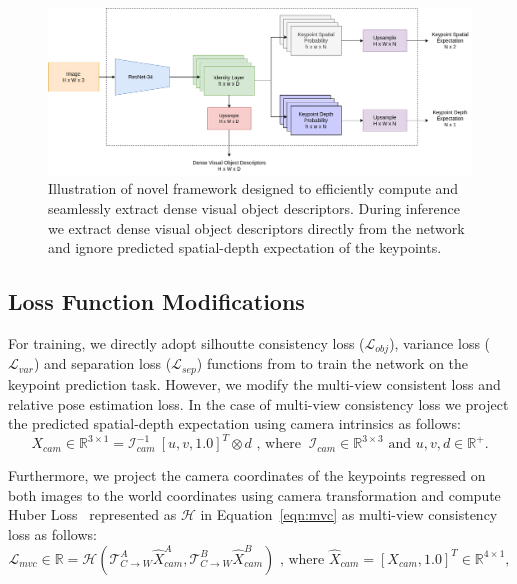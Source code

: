 \begin{figure}[htb]
    \centering
    \includegraphics[scale=0.35]{images/arch.png}
    \caption{Illustration of novel framework designed to efficiently compute and seamlessly extract dense visual object descriptors.
        During inference we extract dense visual object descriptors directly from the network and ignore predicted spatial-depth expectation of the keypoints.}
    \label{fig:modified_dnn}
\end{figure}


\subsection{Loss Function Modifications}

For training, we directly adopt silhoutte consistency loss ($\mathcal{L}_{obj}$), variance loss ($\mathcal{L}_{var}$) and separation loss ($\mathcal{L}_{sep}$) functions from \cite{suwajanakorn2018discovery} to train the network on the keypoint prediction task.
However, we modify the multi-view consistent loss and relative pose estimation loss. In the case of multi-view consistency loss we
project the predicted spatial-depth expectation using camera intrinsics as follows:
\begin{equation}
    X_{cam} \in \mathbb{R}^{3 \times 1} = \mathcal{I}_{cam}^{-1}  \ [u, v, 1.0]^T \otimes d \text{ , where  } \ \mathcal{I}_{cam} \in \mathbb{R}^{3 \times 3} \text{ and }  u, v, d \in \mathbb{R}^+.
\end{equation}

Furthermore, we project the camera coordinates of the keypoints regressed on both images to the
world coordinates using camera transformation and compute Huber Loss~\cite{huber1992robust} represented as $\mathcal{H}$ in Equation~\ref{eqn:mvc} as multi-view consistency loss as follows:
\begin{equation}
    \label{eqn:mvc}
    \mathcal{L}_{mvc} \in \mathbb{R} = \mathcal{H}(\mathcal{T}_{C \rightarrow W}^A \hat{X}^A_{cam}, \mathcal{T}_{C \rightarrow W}^B \hat{X}^B_{cam}) \text{ , where  } \hat{X}_{cam}=[X_{cam}, 1.0]^T \in \mathbb{R}^{4 \times 1} ,
\end{equation}

